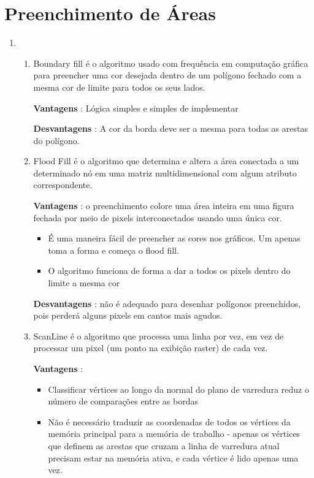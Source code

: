 \section*{Preenchimento de Áreas}

  \begin{enumerate}[label=\arabic*)] \addtocounter{enumi}{34}
   
   		\item 
   		
        \begin{enumerate}[label=\alph*.]
		\setlength\itemsep{1em}
		
		\item Boundary fill é o algoritmo usado com frequência em computação gráfica para preencher uma cor desejada dentro de um polígono fechado com a mesma cor de limite para todos os seus lados.
		
		\textbf{Vantagens} : Lógica simples e simples de implementar
		
		\textbf{Desvantagens} : A cor da borda deve ser a mesma para todas as arestas do polígono.
		
		\item Flood Fill é o algoritmo que determina e altera a área conectada a um determinado nó em uma matriz multidimensional com algum atributo correspondente.
	
		\textbf{Vantagens} : o preenchimento colore uma área inteira em uma figura fechada por meio de pixels interconectados usando uma única cor.
		
		\begin{itemize}
			\item  É uma maneira fácil de preencher as cores nos gráficos. Um apenas toma a forma e começa o flood fill.
			\item  O algoritmo funciona de forma a dar a todos os pixels dentro do limite a mesma cor
		\end{itemize}
       

		
		\textbf{Desvantagens} : não é adequado para desenhar polígonos preenchidos, pois perderá alguns pixels em cantos mais agudos.
		
		\item ScanLine é o algoritmo que processa uma linha por vez, em vez de processar um pixel (um ponto na exibição raster) de cada vez.
		
		\textbf{Vantagens} : 
		\begin{itemize}
			\item Classificar vértices ao longo da normal do plano de varredura reduz o número de comparações entre as bordas
			\item Não é necessário traduzir as coordenadas de todos os vértices da memória principal para a memória de trabalho - apenas os vértices que definem as arestas que cruzam a linha de varredura atual precisam estar na memória ativa, e cada vértice é lido apenas uma vez.
		\end{itemize}
		

\end{enumerate}
\end{enumerate}

